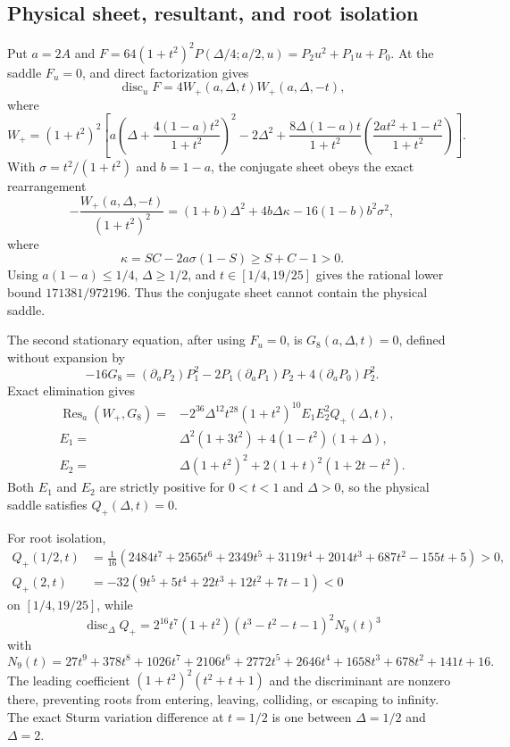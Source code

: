 \documentclass[11pt,a4paper]{article}
\theoremstyle{remark}
\begin{document}
\subsection{Physical sheet, resultant, and root isolation}

Put $a=2A$ and
$F=64(1+t^2)^2P(\Delta/4;a/2,u)=P_2u^2+P_1u+P_0$.
At the saddle $F_u=0$, and direct factorization gives
\[
 \operatorname{disc}_uF=4W_+(a,\Delta,t)W_+(a,\Delta,-t),
\]
where
\[
 W_+=(1+t^2)^2\left[
 a\left(\Delta+\frac{4(1-a)t^2}{1+t^2}\right)^2-2\Delta^2
 +\frac{8\Delta(1-a)t}{1+t^2}
 \left(\frac{2at^2+1-t^2}{1+t^2}\right)\right].
\]
With $\sigma=t^2/(1+t^2)$ and $b=1-a$, the conjugate sheet obeys the exact
rearrangement
\[
 -\frac{W_+(a,\Delta,-t)}{(1+t^2)^2}
 =(1+b)\Delta^2+4b\Delta\kappa-16(1-b)b^2\sigma^2,
\]
where
\[
 \kappa=SC-2a\sigma(1-S)\geq S+C-1>0.
\]
Using $a(1-a)\leq1/4$, $\Delta\geq1/2$, and
$t\in[1/4,19/25]$ gives the rational lower bound
$171381/972196$.  Thus the conjugate sheet cannot contain the physical
saddle.

The second stationary equation, after using $F_u=0$, is
$G_8(a,\Delta,t)=0$, defined without expansion by
\[
 -16G_8=(\partial_aP_2)P_1^2
 -2P_1(\partial_aP_1)P_2+4(\partial_aP_0)P_2^2.
\]
Exact elimination gives
\begin{align*}
 \operatorname{Res}_a(W_+,G_8)
 ={}&-2^{36}\Delta^{12}t^{28}(1+t^2)^{10}E_1E_2^2Q_+(\Delta,t),\\
 E_1={}&\Delta^2(1+3t^2)+4(1-t^2)(1+\Delta),\\
 E_2={}&\Delta(1+t^2)^2+2(1+t)^2(1+2t-t^2).
\end{align*}
Both $E_1$ and $E_2$ are strictly positive for $0<t<1$ and
$\Delta>0$, so the physical saddle satisfies $Q_+(\Delta,t)=0$.

For root isolation,
\begin{align*}
 Q_+(1/2,t)&=\frac1{16}
 (2484t^7+2565t^6+2349t^5+3119t^4+2014t^3
 +687t^2-155t+5)>0,\\
 Q_+(2,t)&=-32(9t^5+5t^4+22t^3+12t^2+7t-1)<0
\end{align*}
on $[1/4,19/25]$, while
\[
 \operatorname{disc}_\Delta Q_+
 =2^{16}t^7(1+t^2)(t^3-t^2-t-1)^2N_9(t)^3
\]
with
\[
 N_9(t)=27t^9+378t^8+1026t^7+2106t^6+2772t^5
 +2646t^4+1658t^3+678t^2+141t+16.
\]
The leading coefficient $(1+t^2)^2(t^2+t+1)$ and the discriminant are
nonzero there, preventing roots from entering, leaving, colliding, or
escaping to infinity.  The exact Sturm variation difference at $t=1/2$ is
one between $\Delta=1/2$ and $\Delta=2$.
\end{document}
